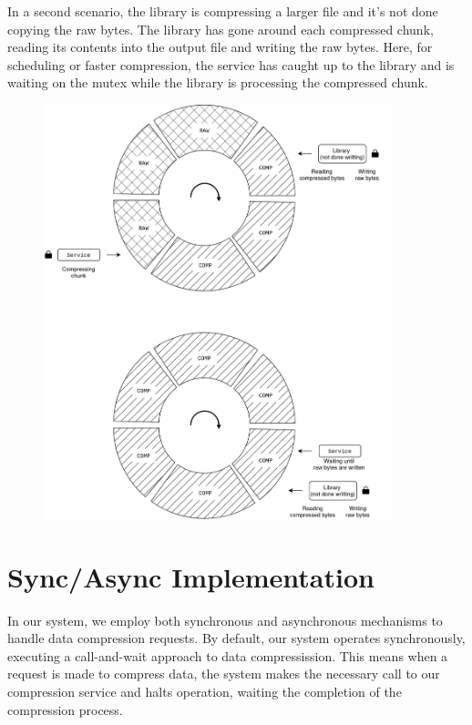 \documentclass[12pt]{article}
\begin{document}
\newpage
\par In a second scenario, the library is compressing a larger file and it's not done copying the raw bytes.
The library has gone around each compressed chunk, reading its contents into the output file and writing the raw bytes.
Here, for scheduling or faster compression, the service has caught up to the library and is waiting on the mutex while the library is processing the compressed chunk.
\begin{figure}[h]
\centering
\includegraphics[width=0.9\textwidth]{AOS-not-done.png}
\end{figure}
\FloatBarrier
\newpage


\section*{Sync/Async Implementation}
In our system, we employ both synchronous and asynchronous mechanisms to handle data compression requests. By default, our system operates synchronously, executing a call-and-wait approach to data compressission. This means when a request is made to compress data, the system makes the necessary call to our compression service and halts operation, waiting the completion of the compression process. 
\end{document}
